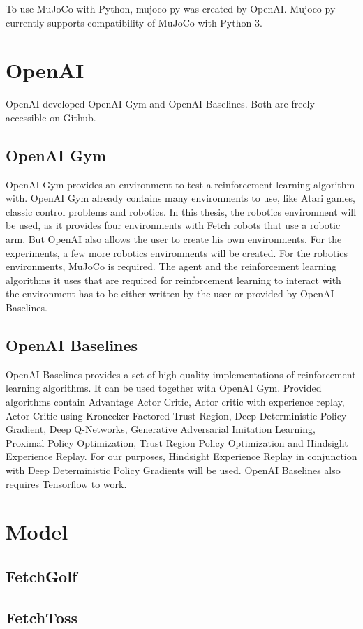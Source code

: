 To use MuJoCo with Python, mujoco-py was created by OpenAI. Mujoco-py currently supports compatibility of MuJoCo with Python 3.



\section{OpenAI}

OpenAI developed OpenAI Gym and OpenAI Baselines. Both are freely accessible on Github.


\subsection{OpenAI Gym}

OpenAI Gym provides an environment to test a reinforcement learning algorithm with. OpenAI Gym already contains many environments to use, like Atari games, classic control problems and robotics. In this thesis, the robotics environment will be used, as it provides four environments with Fetch robots that use a robotic arm. But OpenAI also allows the user to create his own environments. For the experiments, a few more robotics environments will be created. For the robotics environments, MuJoCo is required. 
The agent and the reinforcement learning algorithms it uses that are required for reinforcement learning to interact with the environment has to be either written by the user or provided by OpenAI Baselines.

\subsection{OpenAI Baselines}

OpenAI Baselines provides a set of high-quality implementations of reinforcement learning algorithms. It can be used together with OpenAI Gym. Provided algorithms contain Advantage Actor Critic, Actor critic with experience replay, Actor Critic using Kronecker-Factored Trust Region,  Deep Deterministic Policy Gradient, Deep Q-Networks, Generative Adversarial Imitation Learning, Proximal Policy Optimization, Trust Region Policy Optimization and Hindsight Experience Replay.
For our purposes, Hindsight Experience Replay in conjunction with Deep Deterministic Policy Gradients will be used. 
OpenAI Baselines also requires Tensorflow to work.

\section{Model}



\subsection{FetchGolf}



\subsection{FetchToss}